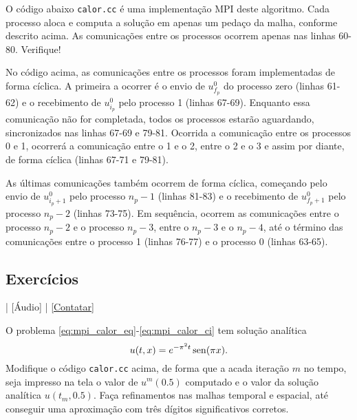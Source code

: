 O código abaixo \verb+calor.cc+ é uma implementação MPI deste algoritmo. Cada processo aloca e computa a solução em apenas um pedaço da malha, conforme descrito acima. As comunicações entre os processos ocorrem apenas nas linhas 60-80. Verifique!



No código acima, as comunicações entre os processos foram implementadas de forma cíclica. A primeira a ocorrer é o envio de $u^0_{f_p}$ do processo zero (linhas 61-62) e o recebimento de $u^0_{i_p}$ pelo processo 1 (linhas 67-69). Enquanto essa comunicação não for completada, todos os processos estarão aguardando, sincronizados nas linhas 67-69 e 79-81. Ocorrida a comunicação entre os processos 0 e 1, ocorrerá a comunicação entre o 1 e o 2, entre o 2 e o 3 e assim por diante, de forma cíclica (linhas 67-71 e 79-81).

As últimas comunicações também ocorrem de forma cíclica, começando pelo envio de $u^0_{i_p+1}$ pelo processo $n_p-1$ (linhas 81-83) e o recebimento de $u^0_{f_p+1}$ pelo processo $n_p-2$ (linhas 73-75). Em sequência, ocorrem as comunicações entre o processo $n_p-2$ e o processo $n_p-3$, entre o $n_p-3$ e o $n_p-4$, até o término das comunicações entre o processo 1 (linhas 76-77) e o processo 0 (linhas 63-65).

\subsection* {Exercícios}

\begin{flushright}
  [Vídeo] | [Áudio] | \href{https://phkonzen.github.io/notas/contato.html}{[Contatar]}
\end{flushright}

\begin{exer}\label{exer:mpi_calor_sa}
  O problema \eqref{eq:mpi_calor_eq}-\eqref{eq:mpi_calor_ci} tem solução analítica
  \begin{equation}
    u(t,x) = e^{-\pi^2 t}\operatorname{sen}(\pi x). 
  \end{equation}
  Modifique o código \verb+calor.cc+ acima, de forma que a acada iteração $m$ no tempo, seja impresso na tela o valor de $u^m(0.5)$ computado e o valor da solução analítica $u(t_m, 0.5)$. Faça refinamentos nas malhas temporal e espacial, até conseguir uma aproximação com três dígitos significativos corretos.
\end{exer}

